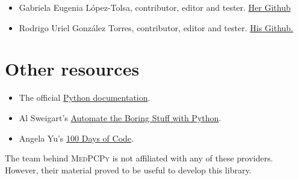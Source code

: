 \documentclass[a4paper,12pt]{article}
\begin{document}
\begin{itemize}
    \item Gabriela Eugenia López-Tolsa, contributor, editor and tester. \href{https://github.com/GELopezTolsa}{Her Github}
\item Rodrigo Uriel González Torres, contributor, editor and tester. \href{https://github.com/RodrigoUriGT}{His Github.}
\end{itemize}

\section{Other resources}

\begin{itemize}
    \item The official \href{https://www.python.org/doc/}{Python documentation}.
    \item Al Sweigart's \href{https://automatetheboringstuff.com/}{Automate the Boring Stuff with Python}.
    \item Angela Yu's \href{https://www.udemy.com/course/100-days-of-code/}{100 Days of Code}.
\end{itemize}

The team behind {\scshape MedPCPy} is not affiliated with any of these providers. However, their material proved to be useful to develop this library.
\end{document}
